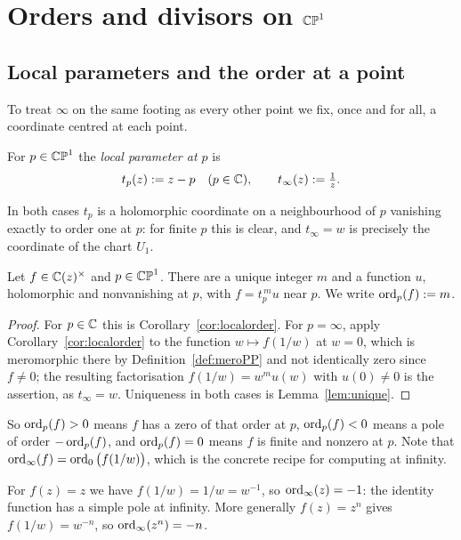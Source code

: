 \section{Orders and divisors on $\mathbb{CP}^1$}\label{sec:divisors}

\subsection{Local parameters and the order at a point}

To treat $\infty$ on the same footing as every other point we fix, once and for
all, a coordinate centred at each point.

\begin{definition}\label{def:localparam}
For $p \in \mathbb{CP}^1$ the \emph{local parameter at $p$} is
\[
t_p(z) := z - p \quad (p \in \mathbb{C}), \qquad t_\infty(z) := \tfrac{1}{z}.
\]
\end{definition}

In both cases $t_p$ is a holomorphic coordinate on a neighbourhood of $p$
vanishing exactly to order one at $p$: for finite $p$ this is clear, and
$t_\infty = w$ is precisely the coordinate of the chart $U_1$.

\begin{smjproposition}\label{prop:ord}
Let $f \in \mathbb{C}(z)^\times$ and $p \in \mathbb{CP}^1$. There are a unique integer $m$ and a
function $u$, holomorphic and nonvanishing at $p$, with $f = t_p^{\,m} u$ near
$p$. We write $\operatorname{ord}_p(f) := m$.
\end{smjproposition}

\begin{proof}
For $p \in \mathbb{C}$ this is Corollary~\ref{cor:localorder}. For $p = \infty$, apply
Corollary~\ref{cor:localorder} to the function $w \mapsto f(1/w)$ at $w = 0$,
which is meromorphic there by Definition~\ref{def:meroPP} and not identically
zero since $f \neq 0$; the resulting factorisation $f(1/w) = w^m u(w)$ with
$u(0) \neq 0$ is the assertion, as $t_\infty = w$. Uniqueness in both cases is
Lemma~\ref{lem:unique}.
\end{proof}

So $\operatorname{ord}_p(f) > 0$ means $f$ has a zero of that order at $p$, $\operatorname{ord}_p(f) < 0$
means a pole of order $-\operatorname{ord}_p(f)$, and $\operatorname{ord}_p(f) = 0$ means $f$ is finite and
nonzero at $p$. Note that $\operatorname{ord}_\infty(f) = \operatorname{ord}_0\big(f(1/w)\big)$, which is the
concrete recipe for computing at infinity.

\begin{example}\label{ex:ordinfty}
For $f(z) = z$ we have $f(1/w) = 1/w = w^{-1}$, so $\operatorname{ord}_\infty(z) = -1$: the
identity function has a simple pole at infinity. More generally $f(z) = z^n$
gives $f(1/w) = w^{-n}$, so $\operatorname{ord}_\infty(z^n) = -n$.
\end{example}

